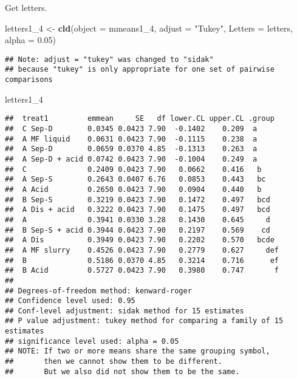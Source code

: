 \documentclass[
]{article}
\newenvironment{Shaded}{\begin{snugshade}}{\end{snugshade}}
\newcommand{\AttributeTok}[1]{\textcolor[rgb]{0.13,0.29,0.53}{#1}}
\newcommand{\FloatTok}[1]{\textcolor[rgb]{0.00,0.00,0.81}{#1}}
\newcommand{\FunctionTok}[1]{\textcolor[rgb]{0.13,0.29,0.53}{\textbf{#1}}}
\newcommand{\NormalTok}[1]{#1}
\newcommand{\OtherTok}[1]{\textcolor[rgb]{0.56,0.35,0.01}{#1}}
\newcommand{\StringTok}[1]{\textcolor[rgb]{0.31,0.60,0.02}{#1}}
\begin{document}
Get letters.

\begin{Shaded}
\begin{Highlighting}[]
\NormalTok{letters1\_4 }\OtherTok{\textless{}{-}} \FunctionTok{cld}\NormalTok{(}\AttributeTok{object =}\NormalTok{ mmeans1\_4,}
                  \AttributeTok{adjust =} \StringTok{"Tukey"}\NormalTok{,}
                  \AttributeTok{Letters =}\NormalTok{ letters,}
                  \AttributeTok{alpha =} \FloatTok{0.05}\NormalTok{)}
\end{Highlighting}
\end{Shaded}

\begin{verbatim}
## Note: adjust = "tukey" was changed to "sidak"
## because "tukey" is only appropriate for one set of pairwise comparisons
\end{verbatim}

\begin{Shaded}
\begin{Highlighting}[]
\NormalTok{letters1\_4}
\end{Highlighting}
\end{Shaded}

\begin{verbatim}
##  treat1         emmean     SE   df lower.CL upper.CL .group 
##  C Sep-D        0.0345 0.0423 7.90  -0.1402    0.209  a     
##  A MF liquid    0.0631 0.0423 7.90  -0.1115    0.238  a     
##  A Sep-D        0.0659 0.0370 4.85  -0.1313    0.263  a     
##  A Sep-D + acid 0.0742 0.0423 7.90  -0.1004    0.249  a     
##  C              0.2409 0.0423 7.90   0.0662    0.416   b    
##  A Sep-S        0.2643 0.0407 6.76   0.0853    0.443   bc   
##  A Acid         0.2650 0.0423 7.90   0.0904    0.440   b    
##  B Sep-S        0.3219 0.0423 7.90   0.1472    0.497   bcd  
##  A Dis + acid   0.3222 0.0423 7.90   0.1475    0.497   bcd  
##  A              0.3941 0.0330 3.28   0.1430    0.645     d  
##  B Sep-S + acid 0.3944 0.0423 7.90   0.2197    0.569    cd  
##  A Dis          0.3949 0.0423 7.90   0.2202    0.570   bcde 
##  A MF slurry    0.4526 0.0423 7.90   0.2779    0.627     def
##  B              0.5186 0.0370 4.85   0.3214    0.716      ef
##  B Acid         0.5727 0.0423 7.90   0.3980    0.747       f
## 
## Degrees-of-freedom method: kenward-roger 
## Confidence level used: 0.95 
## Conf-level adjustment: sidak method for 15 estimates 
## P value adjustment: tukey method for comparing a family of 15 estimates 
## significance level used: alpha = 0.05 
## NOTE: If two or more means share the same grouping symbol,
##       then we cannot show them to be different.
##       But we also did not show them to be the same.
\end{verbatim}
\end{document}
